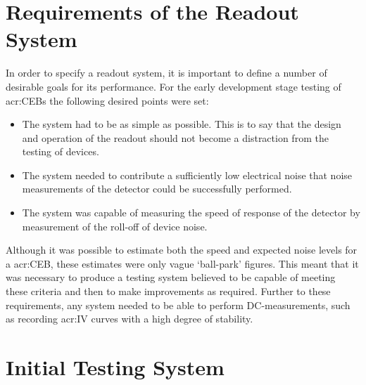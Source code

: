 \section{Requirements of the Readout System}\label{ssec:readout_requirements}
In order to specify a readout system, it is important to define a number of desirable goals for its performance. For the early development stage testing of \glspl{acr:CEB} the following desired points were set:
\begin{itemize}
\item The system had to be as simple as possible. This is to say that the design and operation of the readout should not become a distraction from the testing of devices.
\item The system needed to contribute a sufficiently low electrical noise that noise measurements of the detector could be successfully  performed.
\item The system was capable of measuring the speed of response of the detector by measurement of the roll-off of device noise.
\end{itemize}
Although it was possible to estimate both the speed and expected noise levels for a \gls{acr:CEB}, these estimates were only vague `ball-park' figures. This meant that it was necessary to produce a testing system believed to be capable of meeting these criteria and then to make improvements as required. Further to these requirements, any system needed to be able to perform DC-measurements, such as recording \gls{acr:IV} curves with a high degree of stability.

\section{Initial Testing System}
\label{sec:initial_readout_system}
